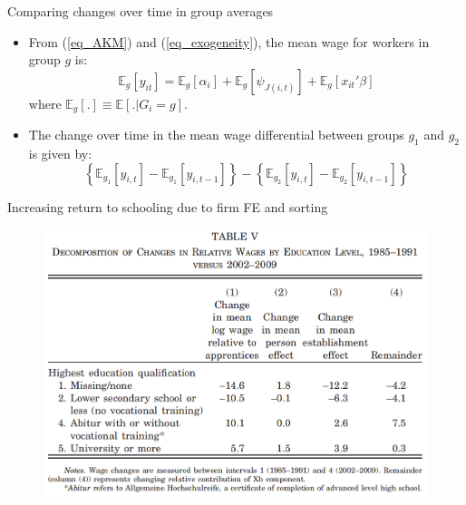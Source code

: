 \documentclass[notes=show]{beamer}
\begin{document}
\begin{frame}{Comparing changes over time in group averages}
\begin{itemize}
\item From (\ref{eq_AKM}) and (\ref{eq_exogeneity}), the mean wage for workers in group $g$ is:
    \begin{equation} \label{eq_group_means}
	   \mathbb{E}_{g} \left[ y_{it} \right] = \mathbb{E}_{g} \left[ \alpha_{i} \right] + \mathbb{E}_{g} \left[ \psi_{J(i,t)} \right] + \mathbb{E}_{g} \left[ x_{it}'\beta \right]
    \end{equation}
    where $ \mathbb{E}_{g} \left[ . \right] \equiv \mathbb{E} \left[ . | G_{i}=g \right]$. \medskip
\item The change over time in the mean wage differential between groups $g_{1}$ and $g_{2}$ is given by:
    \begin{equation*}
	  \left\{ \mathbb{E}_{g_{1}} \left[ y_{i,t} \right] - \mathbb{E}_{g_{1}} \left[ y_{i,t-1} \right] \right\} -  \left\{ \mathbb{E}_{g_{2}} \left[ y_{i,t} \right] - \mathbb{E}_{g_{2}} \left[ y_{i,t-1} \right] \right\}
    \end{equation*}
 \end{itemize}
\end{frame}

\begin{frame}{Increasing return to schooling due to firm FE and sorting}
\begin{figure}[p!]
 \includegraphics[width=\textwidth]{figures/Table5} 
\end{figure}
\end{frame}

\end{document}
